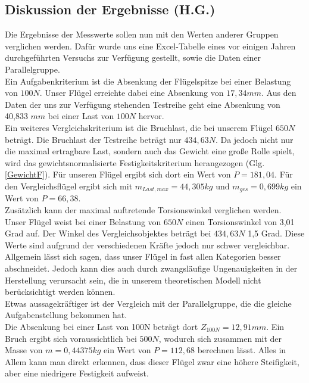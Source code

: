 \subsection{Diskussion der Ergebnisse (H.G.)}
Die Ergebnisse der Messwerte sollen nun mit den Werten anderer Gruppen verglichen werden. Dafür wurde uns eine Excel-Tabelle eines vor einigen Jahren durchgeführten Versuchs zur Verfügung gestellt, sowie die Daten einer Parallelgruppe.\\
\noindent
Ein Aufgabenkriterium ist die Absenkung der Flügelspitze bei einer Belastung von $100N$. Unser Flügel erreichte dabei eine Absenkung von $17,34mm$. Aus den Daten der uns zur Verfügung stehenden Testreihe geht eine Absenkung von 40,833 $mm$ bei einer Last von $100N$ hervor.\\
\noindent
Ein weiteres Vergleichskriterium ist die Bruchlast, die bei unserem Flügel $ 650N $ beträgt. Die Bruchlast der Testreihe beträgt nur $434,63 N$. Da jedoch nicht nur die maximal ertragbare Last, sondern auch das Gewicht eine große Rolle spielt, wird das gewichtsnormalisierte Festigkeitskriterium herangezogen (Glg. \ref{GewichtF}). Für unseren Flügel ergibt sich dort ein Wert von $P=181,04$. Für den Vergleichsflügel ergibt sich mit $m_{Last,max}=44,305kg$ und $m_{ges}=0,699kg$ ein Wert von $P=66,38$.\\
\noindent
Zusätzlich kann der maximal auftretende Torsionswinkel verglichen werden. Unser Flügel weist bei einer Belastung von $ 650N $ einen Torsionswinkel von 3,01 Grad auf. Der Winkel des Vergleichsobjektes beträgt bei $434,63 N$  1,5 Grad. Diese Werte sind aufgrund der verschiedenen Kräfte jedoch nur schwer vergleichbar.\\
Allgemein lässt sich sagen, dass unser Flügel in fast allen Kategorien besser abschneidet. Jedoch kann dies auch durch zwangsläufige Ungenauigkeiten in der Herstellung verursacht sein, die in unserem theoretischen Modell nicht berücksichtigt werden können.\\
\noindent
Etwas aussagekräftiger ist der Vergleich mit der Parallelgruppe, die die gleiche Aufgabenstellung bekommen hat.\\
\noindent
Die Absenkung bei einer Last von 100N beträgt dort $Z_{100N}=12,91mm$. Ein Bruch ergibt sich voraussichtlich bei $500N$, wodurch sich zusammen mit der Masse von $m=0,44375kg$ ein Wert von $P=112,68$ berechnen lässt. Alles in Allem kann man direkt erkennen, dass dieser Flügel zwar eine höhere Steifigkeit, aber eine niedrigere Festigkeit aufweist.\\

